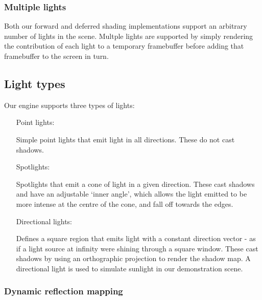 \documentclass[11pt]{scrartcl} %
\begin{document}
        \subsubsection{Multiple lights}

            Both our forward and deferred shading implementations support an
            arbitrary number of lights in the scene. Multple lights are
            supported by simply rendering the contribution of each light to a
            temporary framebuffer before adding that framebuffer to the screen
            in turn.

        \subsection{Light types}

            Our engine supports three types of lights:

            \begin{itemize}

            \item[Point lights:]

                Simple point lights that emit light in all directions. These do
                not cast shadows.

            \item[Spotlights:]

                Spotlights that emit a cone of light in a given direction.
                These cast shadows and have an adjustable `inner angle', which
                allows the light emitted to be more intense at the centre of
                the cone, and fall off towards the edges.

            \item[Directional lights:]

                Defines a square region that emits light with a constant
                direction vector - as if a light source at infinity were
                shining through a square window. These cast shadows by using an
                orthographic projection to render the shadow map. A directional
                light is used to simulate sunlight in our demonstration scene.

            \end{itemize}

        \subsubsection{Dynamic reflection mapping}
\end{document}
